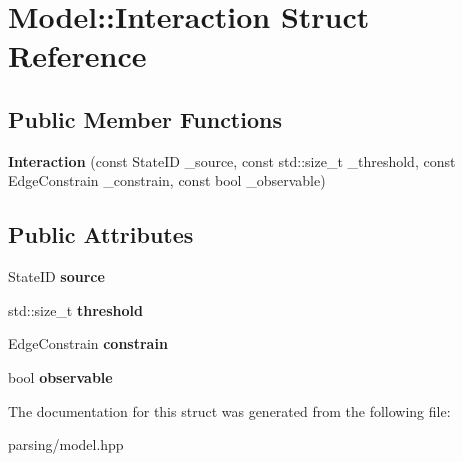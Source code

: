 \hypertarget{struct_model_1_1_interaction}{\section{Model\-:\-:Interaction Struct Reference}
\label{struct_model_1_1_interaction}
}
\subsection*{Public Member Functions}
\begin{DoxyCompactItemize}
\item 
\hypertarget{struct_model_1_1_interaction_aa4890043c70a73b630342dc8699d1d8b}{{\bfseries Interaction} (const State\-I\-D \-\_\-source, const std\-::size\-\_\-t \-\_\-threshold, const Edge\-Constrain \-\_\-constrain, const bool \-\_\-observable)}\label{struct_model_1_1_interaction_aa4890043c70a73b630342dc8699d1d8b}

\end{DoxyCompactItemize}
\subsection*{Public Attributes}
\begin{DoxyCompactItemize}
\item 
\hypertarget{struct_model_1_1_interaction_a6b1e4695b14c3e29d819489b8242c916}{State\-I\-D {\bfseries source}}\label{struct_model_1_1_interaction_a6b1e4695b14c3e29d819489b8242c916}

\item 
\hypertarget{struct_model_1_1_interaction_ad25a25987461269dcdb8f65372cb29bc}{std\-::size\-\_\-t {\bfseries threshold}}\label{struct_model_1_1_interaction_ad25a25987461269dcdb8f65372cb29bc}

\item 
\hypertarget{struct_model_1_1_interaction_a0d77cc99f52ea7fc8cc6dad3d145a98f}{Edge\-Constrain {\bfseries constrain}}\label{struct_model_1_1_interaction_a0d77cc99f52ea7fc8cc6dad3d145a98f}

\item 
\hypertarget{struct_model_1_1_interaction_afceb2f81791f446a9fd10b5cf97b3bb3}{bool {\bfseries observable}}\label{struct_model_1_1_interaction_afceb2f81791f446a9fd10b5cf97b3bb3}

\end{DoxyCompactItemize}


The documentation for this struct was generated from the following file\-:\begin{DoxyCompactItemize}
\item 
parsing/model.\-hpp\end{DoxyCompactItemize}
